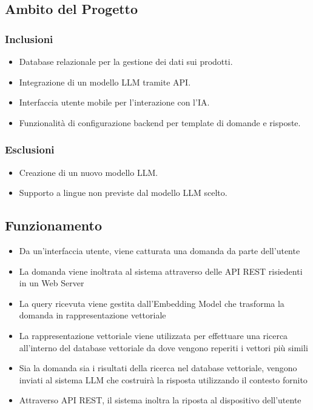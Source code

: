 \documentclass{article}
\begin{document}
    \subsection{Ambito del Progetto}

        \subsubsection{Inclusioni}
        \begin{itemize}
            \item Database relazionale per la gestione dei dati sui prodotti.
            \item Integrazione di un modello LLM tramite API.
            \item Interfaccia utente mobile per l'interazione con l'IA.
            \item Funzionalità di configurazione backend per template di domande e risposte.
        \end{itemize}
        \subsubsection{Esclusioni}
        \begin{itemize}
            \item Creazione di un nuovo modello LLM.
            \item Supporto a lingue non previste dal modello LLM scelto.
        \end{itemize}

    \subsection{Funzionamento}
    \begin{itemize}
        \item Da un’interfaccia utente, viene catturata una domanda da parte dell’utente
        \item La domanda viene inoltrata al sistema attraverso delle API REST risiedenti in un Web Server
        \item La query ricevuta viene gestita dall’Embedding Model che trasforma la domanda in rappresentazione vettoriale
        \item La rappresentazione vettoriale viene utilizzata per effettuare una ricerca all’interno del database vettoriale da dove vengono reperiti i vettori più simili
        \item Sia la domanda sia i risultati della ricerca nel database vettoriale, vengono inviati al sistema LLM che costruirà la risposta utilizzando il contesto fornito
        \item Attraverso API REST, il sistema inoltra la riposta al dispositivo dell’utente
    \end{itemize}
\end{document}
